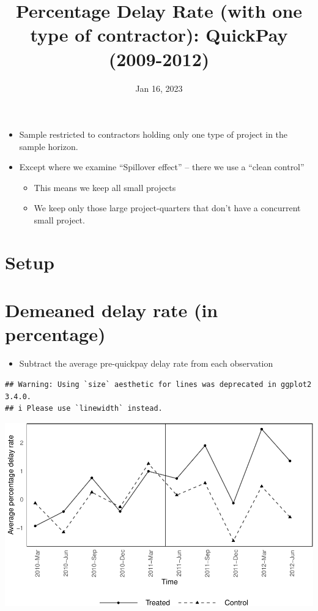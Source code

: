 \documentclass[
]{article}
\title{Percentage Delay Rate (with one type of contractor): QuickPay
(2009-2012)}
\author{}
\date{\vspace{-2.5em}Jan 16, 2023}
\providecommand{\tightlist}{%
  \setlength{\itemsep}{0pt}\setlength{\parskip}{0pt}}
\begin{document}
\maketitle

\begin{itemize}
\tightlist
\item
  Sample restricted to contractors holding only one type of project in
  the sample horizon.
\item
  Except where we examine ``Spillover effect'' -- there we use a ``clean
  control''

  \begin{itemize}
  \tightlist
  \item
    This means we keep all small projects
  \item
    We keep only those large project-quarters that don't have a
    concurrent small project.
  \end{itemize}
\end{itemize}

\hypertarget{setup}{%
\section{Setup}\label{setup}}

\hypertarget{demeaned-delay-rate-in-percentage}{%
\section{Demeaned delay rate (in
percentage)}\label{demeaned-delay-rate-in-percentage}}

\begin{itemize}
\tightlist
\item
  Subtract the average pre-quickpay delay rate from each observation
\end{itemize}

\begin{verbatim}
## Warning: Using `size` aesthetic for lines was deprecated in ggplot2 3.4.0.
## i Please use `linewidth` instead.
\end{verbatim}

\includegraphics{qp_first_pc_delay_one_type_files/figure-latex/demeaned_plot_one_type-1.pdf}
\end{document}
